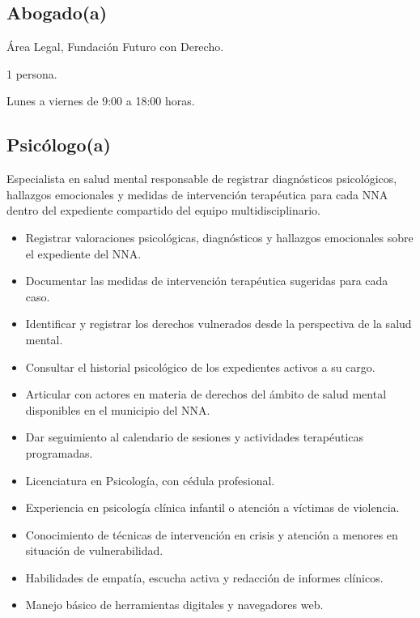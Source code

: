 \begin{Usuario}{\hypertarget{A.Abogado}{\subsection{Abogado(a)}}}
	\item[Área:] Área Legal, Fundación Futuro con Derecho.
	\item[Cantidad aproximada:] 1 persona.
	\item[Horario de actividad:] Lunes a viernes de 9:00 a 18:00 horas.
\end{Usuario}

\begin{Usuario}{\hypertarget{A.Psicologo}{\subsection{Psicólogo(a)}}}{
		Especialista en salud mental responsable de registrar diagnósticos 
		psicológicos, hallazgos emocionales y medidas de intervención 
		terapéutica para cada NNA dentro del expediente compartido del 
		equipo multidisciplinario.
	}
	\item[Responsabilidades:] \cdtEmpty
	\begin{itemize}
		\item Registrar valoraciones psicológicas, diagnósticos y 
		hallazgos emocionales sobre el expediente del NNA.
		\item Documentar las medidas de intervención terapéutica 
		sugeridas para cada caso.
		\item Identificar y registrar los derechos vulnerados desde 
		la perspectiva de la salud mental.
		\item Consultar el historial psicológico de los expedientes 
		activos a su cargo.
		\item Articular con actores en materia de derechos del ámbito 
		de salud mental disponibles en el municipio del NNA.
		\item Dar seguimiento al calendario de sesiones y actividades 
		terapéuticas programadas.
	\end{itemize}
	
	\item[Perfil:] \cdtEmpty
	\begin{itemize}
		\item Licenciatura en Psicología, con cédula profesional.
		\item Experiencia en psicología clínica infantil o atención 
		a víctimas de violencia.
		\item Conocimiento de técnicas de intervención en crisis y 
		atención a menores en situación de vulnerabilidad.
		\item Habilidades de empatía, escucha activa y redacción 
		de informes clínicos.
		\item Manejo básico de herramientas digitales y navegadores web.
	\end{itemize}
	

\end{Usuario}
